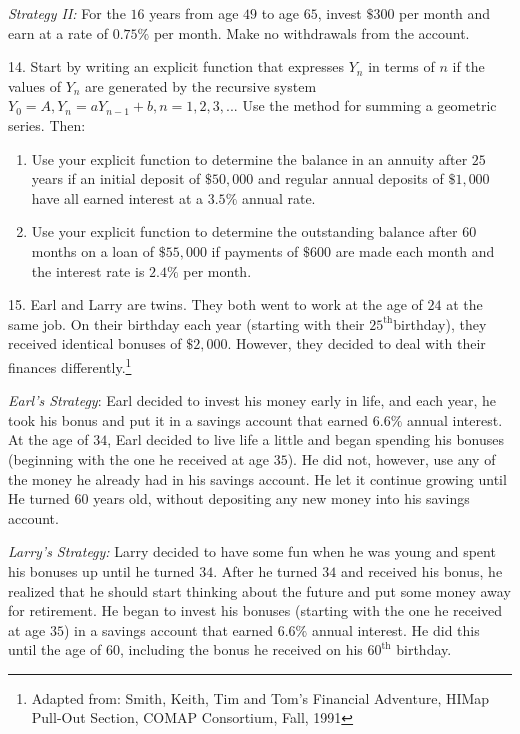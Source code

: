 \documentclass[10pt,]{book}
\theoremstyle{plain}
\theoremstyle{definition}
\theoremstyle{definition}
\theoremstyle{definition}
\numberwithin{equation}{section}
\begin{document}
\begin{exerciselist}
\emph{Strategy II:} For the \(16\) years from age \(49\) to age \(65\), invest \(\$300\) per month and earn at a rate of \(0.75\%\) per month. Make no withdrawals from the account.%
\par\smallskip
\item[14.]\hypertarget{exercise-45}{}Start by writing an explicit function that expresses \(Y_n\) in terms of \(n\) if the values of \(Y_n\) are generated by the recursive system \(Y_0=A, Y_n=aY_{n-1}+b, n = 1, 2, 3, ...\) Use the method for summing a geometric series. Then:%
\leavevmode%
\begin{enumerate}[label=(\alph*)]
\item\hypertarget{li-96}{}Use your explicit function to determine the balance in an annuity after \(25\) years if an initial deposit of \(\$50,000\) and regular annual deposits of \(\$1,000\) have all earned interest at a \(3.5\%\) annual rate.%
\item\hypertarget{li-97}{}Use your explicit function to determine the outstanding balance after \(60\) months on a loan of \(\$55,000\) if payments of \(\$600\) are made each month and the interest rate is \(2.4\%\) per month.%
\end{enumerate}
\par\smallskip
\item[15.]\hypertarget{exercise-46}{}Earl and Larry are twins.  They both went to work at the age of \(24\) at the same job.  On their birthday each year (starting with their \(25^{\text{th}}\)birthday), they received identical bonuses of \(\$2,000\).  However, they decided to deal with their finances differently.\footnote{Adapted from: Smith, Keith, Tim and Tom's Financial Adventure, HIMap Pull-Out Section, COMAP Consortium, Fall, 1991\label{fn-3}}%
\par
%
\par
\emph{Earl's Strategy}: Earl decided to invest his money early in life, and each year, he took his bonus and put it in a savings account that earned \(6.6\%\) annual interest.  At the age of \(34\), Earl decided to live life a little and began spending his bonuses (beginning with the one he received at age \(35\)).  He did not, however, use any of the money he already had in his savings account.  He let it continue growing until He turned \(60\) years old, without depositing any new money into his savings account.%
\par
%
\par
\emph{Larry's Strategy:} Larry decided to have some fun when he was young and spent his bonuses up until he turned \(34\).  After he turned \(34\) and received his bonus, he realized that he should start thinking about the future and put some money away for retirement.  He began to invest his bonuses (starting with the one he received at age \(35\)) in a savings account that earned \(6.6\%\) annual interest.  He did this until the age of \(60\), including the bonus he received on his \(60^{\text{th}}\) birthday.%

\end{exerciselist}
\end{document}
